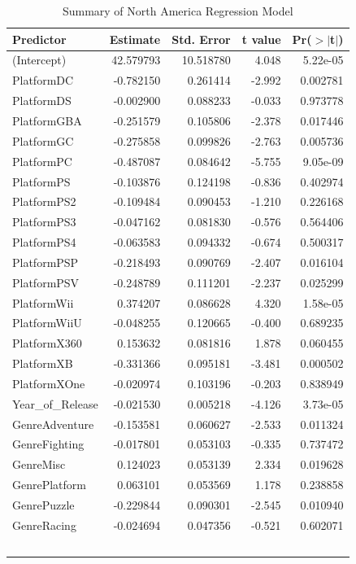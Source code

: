 \documentclass[12pt]{article}
\begin{document}
\begin{table}[ht]
  \caption{Summary of North America Regression Model}
  \label{tab:NA}
\centering
\begin{tabular}{lrrrr}
\hline
Predictor & Estimate & Std. Error & t value & Pr($>$$|$t$|$) \\ 
\hline
(Intercept) & 42.579793 & 10.518780 & 4.048 & 5.22e-05 \\
PlatformDC & -0.782150 & 0.261414 & -2.992 & 0.002781 \\
PlatformDS & -0.002900 & 0.088233 & -0.033 & 0.973778 \\
PlatformGBA & -0.251579 & 0.105806 & -2.378 & 0.017446 \\
PlatformGC & -0.275858 & 0.099826 & -2.763 & 0.005736 \\
PlatformPC & -0.487087 & 0.084642 & -5.755 & 9.05e-09 \\
PlatformPS & -0.103876 & 0.124198 & -0.836 & 0.402974 \\
PlatformPS2 & -0.109484 & 0.090453 & -1.210 & 0.226168 \\
PlatformPS3 & -0.047162 & 0.081830 & -0.576 & 0.564406 \\
PlatformPS4 & -0.063583 & 0.094332 & -0.674 & 0.500317 \\
PlatformPSP & -0.218493 & 0.090769 & -2.407 & 0.016104 \\
PlatformPSV & -0.248789 & 0.111201 & -2.237 & 0.025299 \\
PlatformWii & 0.374207 & 0.086628 & 4.320 & 1.58e-05 \\
PlatformWiiU & -0.048255 & 0.120665 & -0.400 & 0.689235 \\
PlatformX360 & 0.153632 & 0.081816 & 1.878 & 0.060455 \\
PlatformXB & -0.331366 & 0.095181 & -3.481 & 0.000502 \\
PlatformXOne & -0.020974 & 0.103196 & -0.203 & 0.838949 \\
Year\_of\_Release & -0.021530 & 0.005218 & -4.126 & 3.73e-05 \\
GenreAdventure & -0.153581 & 0.060627 & -2.533 & 0.011324 \\
GenreFighting & -0.017801 & 0.053103 & -0.335 & 0.737472 \\
GenreMisc & 0.124023 & 0.053139 & 2.334 & 0.019628 \\
GenrePlatform & 0.063101 & 0.053569 & 1.178 & 0.238858 \\
GenrePuzzle & -0.229844 & 0.090301 & -2.545 & 0.010940 \\
GenreRacing & -0.024694 & 0.047356 & -0.521 & 0.602071 \\
$$
\end{tabular}
\end{table}
\end{document}
